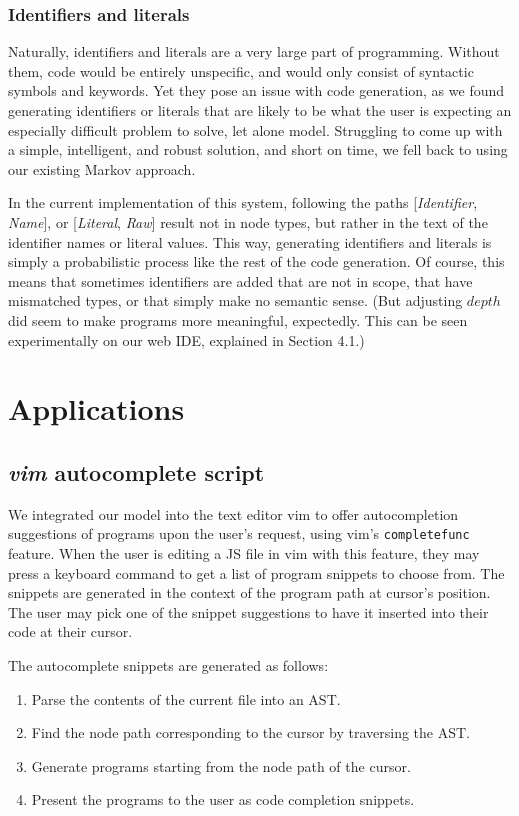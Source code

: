 \documentclass{article}
\begin{document}
\subsubsection{Identifiers and literals}

Naturally, identifiers and literals are a very large part of programming. Without them, code would be entirely unspecific, and would only consist of syntactic symbols and keywords. Yet they pose an issue with code generation, as we found generating identifiers or literals that are likely to be what the user is expecting an especially difficult problem to solve, let alone model. Struggling to come up with a simple, intelligent, and robust solution, and short on time, we fell back to using our existing Markov approach.

In the current implementation of this system, following the paths [\emph{Identifier}, \emph{Name}], or [\emph{Literal}, \emph{Raw}] result not in node types, but rather in the text of the identifier names or literal values. This way, generating identifiers and literals is simply a probabilistic process like the rest of the code generation. Of course, this means that sometimes identifiers are added that are not in scope, that have mismatched types, or that simply make no semantic sense. (But adjusting $depth$ did seem to make programs more meaningful, expectedly. This can be seen experimentally on our web IDE, explained in Section 4.1.)

%

\section{Applications}

\subsection{\emph{vim} autocomplete script}

We integrated our model into the text editor vim to offer autocompletion
suggestions of programs upon the user's request, using vim's
\texttt{completefunc} feature. When the user is editing a JS file in vim with
this feature, they may press a keyboard command to get a list of program
snippets to choose from. The snippets are generated in the context of the
program path at cursor's position. The user may pick one of the snippet
suggestions to have it inserted into their code at their cursor.

The autocomplete snippets are generated as follows:
\begin{enumerate}
	\item Parse the contents of the current file into an AST.
	\item Find the node path corresponding to the cursor by traversing the AST.
	\item Generate programs starting from the node path of the cursor.
	\item Present the programs to the user as code completion snippets.
\end{enumerate}
\end{document}
